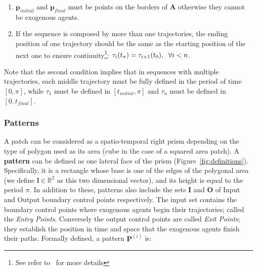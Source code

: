 \begin{enumerate}
	\item $\mathbf{p}_{initial}$ and $\mathbf{p}_{final}$ must be points on the borders of $\mathbf{A}$ otherwise they cannot be exogenous agents.
	\item If the sequence is composed by more than one trajectories, the ending position of one trajectory should be the same as the starting position of the next one to ensure continuity\footnote{See refer to~\cite{Yersin:2009} for more details}:
	$\tau_i(t_{\pi}) = \tau_{i+1}(t_{0}),	\hspace{0.2cm} \forall i < n$.
\end{enumerate}

Note that the second condition implies that in sequences with multiple trajectories, each middle trajectory must be fully defined in the period of time $[0,\pi]$, while $\tau_1$ must be defined in $[t_{initial},\pi]$ and $\tau_n$ must be defined in $[0, t_{final}]$.



\subsubsection{Patterns}

% 
A patch can be considered as a spatio-temporal right prism depending on the type of polygon used as its area (cube in the case of a squared area patch).
A \textbf{pattern} can be defined as one lateral face of the prism (Figure~\ref{fig:definitions}).
Specifically, it is a rectangle whose base is one of the edges of the polygonal area (we define $\mathbf{l} \in \mathbb{R}^2$ as this two dimensional vector), and its height is equal to the period $\pi$.
In addition to these, patterns also include the sets $\mathbf{I}$ and $\mathbf{O}$ of Input and Output boundary control points respectively.
The input set contains the boundary control points where exogenous agents begin their trajectories; called the \emph{Entry Points}.
Conversely the output control points are called \emph{Exit Points}; they establish the position in time and space that the exogenous agents finish their paths.
Formally defined, a pattern $\mathbf{P}^{(i)}$ is:


